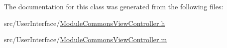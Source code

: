 The documentation for this class was generated from the following files\-:\begin{DoxyCompactItemize}
\item 
src/\-User\-Interface/\hyperlink{_module_commons_view_controller_8h}{Module\-Commons\-View\-Controller.\-h}\item 
src/\-User\-Interface/\hyperlink{_module_commons_view_controller_8m}{Module\-Commons\-View\-Controller.\-m}\end{DoxyCompactItemize}
